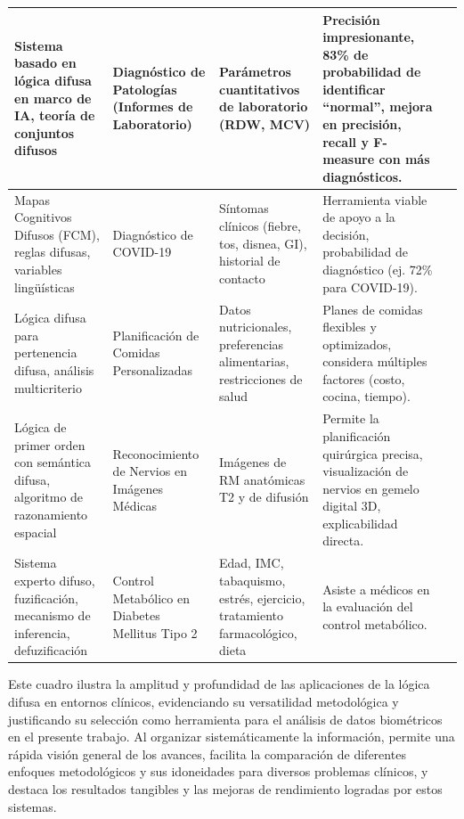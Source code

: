 \begin{longtable}{@{}p{3cm}p{2.5cm}p{2.5cm}p{4cm}p{1.5cm}@{}}
\bottomrule
\endlastfoot
\fontsize{12}{14.4}\selectfont Sistema basado en lógica difusa en marco de IA, teoría de conjuntos difusos & \fontsize{12}{14.4}\selectfont Diagnóstico de Patologías (Informes de Laboratorio) & \fontsize{12}{14.4}\selectfont Parámetros cuantitativos de laboratorio (RDW, MCV) & \fontsize{12}{14.4}\selectfont Precisión impresionante, 83\% de probabilidad de identificar ``normal'', mejora en precisión, recall y F-measure con más diagnósticos. & \fontsize{12}{14.4}\selectfont 2024 \\
\midrule
\fontsize{12}{14.4}\selectfont Mapas Cognitivos Difusos (FCM), reglas difusas, variables lingüísticas & \fontsize{12}{14.4}\selectfont Diagnóstico de COVID-19 & \fontsize{12}{14.4}\selectfont Síntomas clínicos (fiebre, tos, disnea, GI), historial de contacto & \fontsize{12}{14.4}\selectfont Herramienta viable de apoyo a la decisión, probabilidad de diagnóstico (ej. 72\% para COVID-19). & \fontsize{12}{14.4}\selectfont 2020 \\
\midrule
\fontsize{12}{14.4}\selectfont Lógica difusa para pertenencia difusa, análisis multicriterio & \fontsize{12}{14.4}\selectfont Planificación de Comidas Personalizadas & \fontsize{12}{14.4}\selectfont Datos nutricionales, preferencias alimentarias, restricciones de salud & \fontsize{12}{14.4}\selectfont Planes de comidas flexibles y optimizados, considera múltiples factores (costo, cocina, tiempo). & \fontsize{12}{14.4}\selectfont 2023 \\
\midrule
\fontsize{12}{14.4}\selectfont Lógica de primer orden con semántica difusa, algoritmo de razonamiento espacial & \fontsize{12}{14.4}\selectfont Reconocimiento de Nervios en Imágenes Médicas & \fontsize{12}{14.4}\selectfont Imágenes de RM anatómicas T2 y de difusión & \fontsize{12}{14.4}\selectfont Permite la planificación quirúrgica precisa, visualización de nervios en gemelo digital 3D, explicabilidad directa. & \fontsize{12}{14.4}\selectfont 2025 \\
\midrule
\fontsize{12}{14.4}\selectfont Sistema experto difuso, fuzificación, mecanismo de inferencia, defuzificación & \fontsize{12}{14.4}\selectfont Control Metabólico en Diabetes Mellitus Tipo 2 & \fontsize{12}{14.4}\selectfont Edad, IMC, tabaquismo, estrés, ejercicio, tratamiento farmacológico, dieta & \fontsize{12}{14.4}\selectfont Asiste a médicos en la evaluación del control metabólico. & \fontsize{12}{14.4}\selectfont 2018 \\
\end{longtable}

Este cuadro ilustra la amplitud y profundidad de las aplicaciones de la lógica difusa en entornos clínicos, evidenciando su versatilidad metodológica y justificando su selección como herramienta para el análisis de datos biométricos en el presente trabajo. Al organizar sistemáticamente la información, permite una rápida visión general de los avances, facilita la comparación de diferentes enfoques metodológicos y sus idoneidades para diversos problemas clínicos, y destaca los resultados tangibles y las mejoras de rendimiento logradas por estos sistemas.

